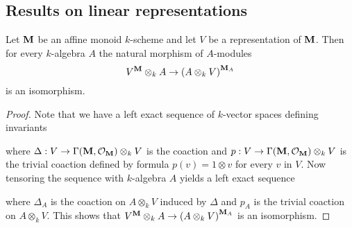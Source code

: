 \subsection{Results on linear representations}

\begin{proposition}\label{proposition:invariants_are_stable_under_tensoring_with_k_algebra}
Let $\mathbf{M}$ be an affine monoid $k$-scheme and let $V$ be a representation of $\mathbf{M}$. Then for every $k$-algebra $A$ the natural morphism of $A$-modules
$$V^{\mathbf{M}}\otimes_{k}A \rightarrow \left(A\otimes_kV\right)^{\mathbf{M}_A}$$
is an isomorphism.
\end{proposition}
\begin{proof}
Note that we have a left exact sequence of $k$-vector spaces defining invariants
\begin{center}
\end{center}
where $\Delta:V\rightarrow \Gamma(\mathbf{M},{\mathcal O}_{\mathbf{M}})\otimes_{k} V$ is the coaction and $p:V\rightarrow \Gamma(\mathbf{M},{\mathcal O}_{\mathbf{M}})\otimes_{k}V$ is the trivial coaction defined by formula $p(v)= 1\otimes v$ for every $v$ in $V$. Now tensoring the sequence with $k$-algebra $A$ yields a left exact sequence
\begin{center}
\end{center}
where $\Delta_A$ is the coaction on $A\otimes_kV$ induced by $\Delta$ and $p_A$ is the trivial coaction on $A\otimes_kV$. This shows that $V^{\mathbf{M}}\otimes_{k}A \rightarrow \left(A\otimes_kV\right)^{\mathbf{M}_A}$ is an isomorphism.
\end{proof}


